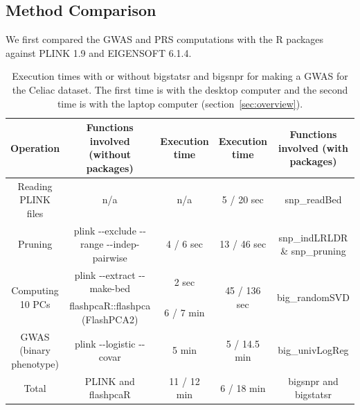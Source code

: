 \documentclass{bioinfo}
\begin{document}
\subsection{Method Comparison}

We first compared the GWAS and PRS computations with the R packages against PLINK 1.9 and EIGENSOFT 6.1.4.

\begin{table}[!tpb]
\centering
\begin{adjustbox}{max width=235pt}
\begin{tabular}{|c|cc|cc|}
\hline
Operation & Functions involved (without packages) & Execution time & Execution time & Functions involved (with packages) \\ 
\hline
Reading PLINK files & n/a & n/a & 5 / 20 sec & snp\_readBed \\
Pruning & plink -{}-exclude -{}-range -{}-indep-pairwise & 4 / 6 sec & 13 / 46 sec & snp\_indLRLDR \& snp\_pruning \\
\multirow{2}{*}{Computing 10 PCs} & plink -{}-extract -{}-make-bed & 2 sec & \multirow{2}{*}{45 / 136 sec} & \multirow{2}{*}{big\_randomSVD} \\
& flashpcaR::flashpca (FlashPCA2) & 6 / 7 min &  &  \\
GWAS (binary phenotype) & plink -{}-logistic -{}-covar & 5 min & 5 / 14.5 min & big\_univLogReg \\
\hline
Total & PLINK and flashpcaR & 11 / 12 min & 6 / 18 min & bigsnpr and bigstatsr \\
\hline
\end{tabular} 
\end{adjustbox}
\caption{Execution times with or without bigstatsr and bigsnpr for making a GWAS for the Celiac dataset. The first time is with the desktop computer and the second time is with the laptop computer (section~\ref{sec:overview}).} 
\label{tab:bench-gwas}
\end{table}
\end{document}
